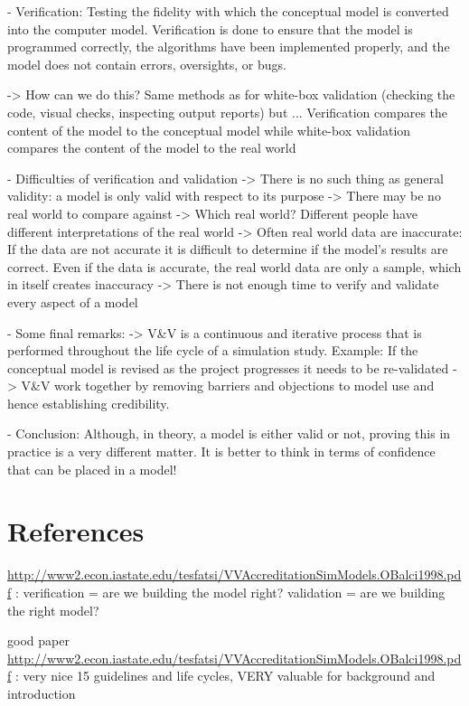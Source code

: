 	- Verification: Testing the fidelity with which the conceptual model is converted into the computer model. Verification is done to ensure that the model is programmed correctly, the algorithms have been implemented properly, and the model does not contain errors, oversights, or bugs.

		-> How can we do this? Same methods as for white-box validation (checking the code, visual checks, inspecting output reports) but ... Verification compares the content of the model to the conceptual model while white-box validation compares the content of the model to the real world
		
	- Difficulties of verification and validation
		-> There is no such thing as general validity: a model is only valid with respect to its purpose
		-> There may be no real world to compare against
		-> Which real world? Different people have different interpretations of the real world
		->  Often real world data are inaccurate: If the data are not accurate it is difficult to determine if the model's results are correct. Even if the data is accurate, the real world data are only a sample, which in itself creates inaccuracy
		-> There is not enough time to verify and validate every aspect of a model
		
	- Some final remarks:
		-> V\&V is a continuous and iterative process that is performed throughout the life cycle of a simulation study.
			Example: If the conceptual model is revised as the project progresses it needs to be re-validated
		-> V\&V work together by removing barriers and objections to model use and hence establishing credibility.
		
	- Conclusion: Although, in theory, a model is either valid or not, proving this in practice is a very different matter. It is better to think in terms of confidence that can be placed in a model!

\section{References}
\url{http://www2.econ.iastate.edu/tesfatsi/VVAccreditationSimModels.OBalci1998.pdf} : verification = are we building the model right? validation = are we building the right model?

good paper \url{http://www2.econ.iastate.edu/tesfatsi/VVAccreditationSimModels.OBalci1998.pdf} : very nice 15 guidelines and life cycles, VERY valuable for background and introduction

